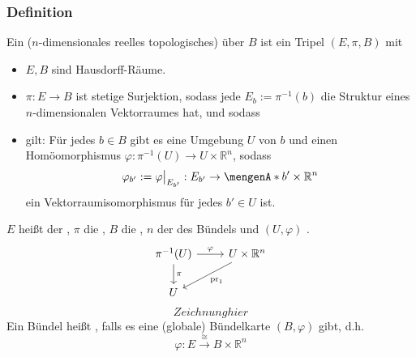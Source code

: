 \subsubsection[Definition: Vektorraumbündel]{Definition} %
\label{ssub:431}
Ein ($n$-dimensionales reelles topologisches)  über $B$ ist ein Tripel $(E,\pi, B)$ mit
\begin{itemize}
	\item $E,B$ sind Hausdorff-Räume. 
	\item $\pi : E \to B$ ist stetige Surjektion, sodass jede  $E_b := \pi ^{-1}(b)$ die Struktur eines $n$-dimensionalen Vektorraumes hat, und sodass
	\item {} gilt: Für jedes $b \in B$ gibt es eine Umgebung $U$ von $b$ und einen Homöomorphismus $\varphi : \pi^{-1}(U) \to U\times \mathds{R}^n$,
	sodass  
	\[
		\varphi_{b'} := \varphi\big|_{E_{b'}} : E_{b'} \to \set{b'} \times \mathds{R}^n 
	\]
	ein Vektorraumisomorphismus für jedes $b' \in U$ ist.
\end{itemize}
$E$ heißt der , $\pi $ die , $B$ die , $n$ der  des Bündels und $(U,\varphi)$ .
\[
	\begin{tikzcd}
		\pi ^{-1}(U) \rar{\varphi} \dar{\pi}& U \times \mathds{R}^n \dlar{\mathrm{pr}_1} \\
		U &
	\end{tikzcd}
\]
\[
	Zeichnung hier
\]
Ein Bündel heißt , falls es eine (globale) Bündelkarte $(B,\varphi)$ gibt, d.h. 
\[
	\varphi : E \xrightarrow{\cong} B \times \mathds{R}^n 
\]

